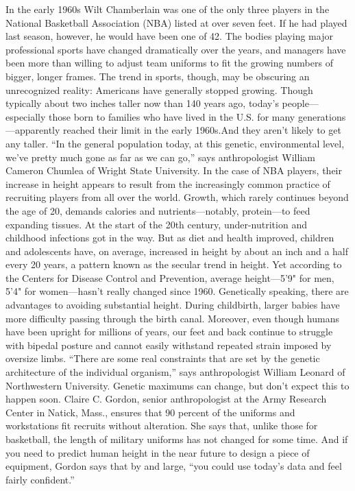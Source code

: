 In the early 1960s Wilt Chamberlain was one of the only three players in the National Basketball Association (NBA) listed at over seven feet. If he had played last season, however, he would have been one of 42. The bodies playing major professional sports have changed dramatically over the years, and managers have been more than willing to adjust team uniforms to fit the growing numbers of bigger, longer frames.
The trend in sports, though, may be obscuring an unrecognized reality: Americans have generally stopped growing. Though typically about two inches taller now than 140 years ago, today’s people—especially those born to families who have lived in the U.S. for many generations—apparently reached their limit in the early 1960s.And they aren’t likely to get any taller. “In the general population today, at this genetic, environmental level, we’ve pretty much gone as far as we can go,” says anthropologist William Cameron Chumlea of Wright State University. In the case of NBA players, their increase in height appears to result from the increasingly common practice of recruiting players from all over the world.
Growth, which rarely continues beyond the age of 20, demands calories and nutrients—notably, protein—to feed expanding tissues. At the start of the 20th century, under-nutrition and childhood infections got in the way. But as diet and health improved, children and adolescents have, on average, increased in height by about an inch and a half every 20 years, a pattern known as the secular trend in height. Yet according to the Centers for Disease Control and Prevention, average height—5'9" for men, 5'4" for women—hasn’t really changed since 1960.
Genetically speaking, there are advantages to avoiding substantial height. During childbirth, larger babies have more difficulty passing through the birth canal. Moreover, even though humans have been upright for millions of years, our feet and back continue to struggle with bipedal posture and cannot easily withstand repeated strain imposed by oversize limbs. “There are some real constraints that are set by the genetic architecture of the individual organism,” says anthropologist William Leonard of Northwestern University.
Genetic maximums can change, but don’t expect this to happen soon. Claire C. Gordon, senior anthropologist at the Army Research Center in Natick, Mass., ensures that 90 percent of the uniforms and workstations fit recruits without alteration. She says that, unlike those for basketball, the length of military uniforms has not changed for some time. And if you need to predict human height in the near future to design a piece of equipment, Gordon says that by and large, “you could use today's data and feel fairly confident.”
